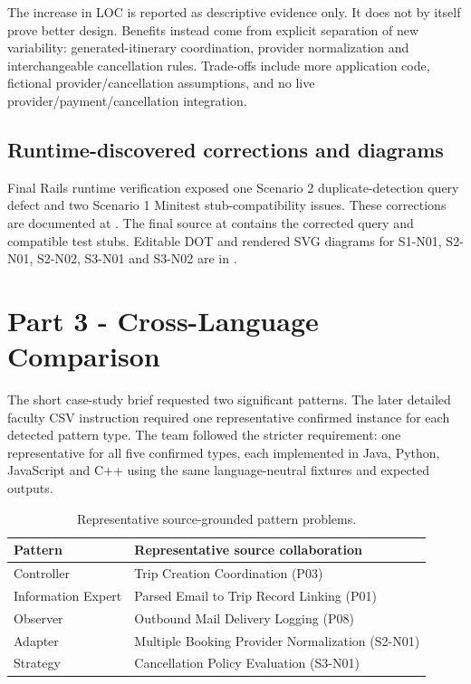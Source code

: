 \documentclass[11pt,a4paper]{article}
\renewcommand{\_}{\textunderscore\allowbreak}
\begin{document}
The increase in LOC is reported as descriptive evidence only. It does not by itself prove better design. Benefits instead come from explicit separation of new variability: generated-itinerary coordination, provider normalization and interchangeable cancellation rules. Trade-offs include more application code, fictional provider/cancellation assumptions, and no live provider/payment/cancellation integration.

\subsection{Runtime-discovered corrections and diagrams}
Final Rails runtime verification exposed one Scenario 2 duplicate-detection query defect and two Scenario 1 Minitest stub-compatibility issues. These corrections are documented at . The final source at  contains the corrected query and compatible test stubs. Editable DOT and rendered SVG diagrams for S1-N01, S2-N01, S2-N02, S3-N01 and S3-N02 are in .

\section{Part 3 - Cross-Language Comparison}
The short case-study brief requested two significant patterns. The later detailed faculty CSV instruction required one representative confirmed instance for each detected pattern type. The team followed the stricter requirement: one representative for all five confirmed types, each implemented in Java, Python, JavaScript and C++ using the same language-neutral fixtures and expected outputs.

\begin{table}[H]\centering\small
\begin{tabularx}{\linewidth}{lX}\toprule
Pattern & Representative source collaboration\\\midrule
Controller & Trip Creation Coordination (P03)\\
Information Expert & Parsed Email to Trip Record Linking (P01)\\
Observer & Outbound Mail Delivery Logging (P08)\\
Adapter & Multiple Booking Provider Normalization (S2-N01)\\
Strategy & Cancellation Policy Evaluation (S3-N01)\\\bottomrule
\end{tabularx}
\caption{Representative source-grounded pattern problems.}
\end{table}
\end{document}
